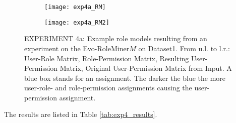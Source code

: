 \begin{figure}[H]
	\centering
	\begin{subfigure}[b]{0.5\textwidth}
		\texttt{[image: exp4a\_RM]}
		\caption{}
		\label{fig:exp4a_RM}
	\end{subfigure}%
	\begin{subfigure}[b]{0.5\textwidth}
		\texttt{[image: exp4a\_RM2]}
		\caption{}
		\label{fig:exp4a_RM2}
	\end{subfigure}
	\caption{EXPERIMENT 4a: Example role models resulting from an experiment on the Evo-RoleMiner$M$ on Dataset1. From u.l. to l.r.: User-Role Matrix, Role-Permission Matrix, Resulting User-Permission Matrix, Original User-Permission Matrix from Input. A blue box stands for an assignment. The darker the blue the more user-role- and role-permission assignments causing the user-permission assignment.}
	\label{fig:exp4a_RM_compare}
\end{figure}

The results are listed in Table \ref{tab:exp4_results}.

